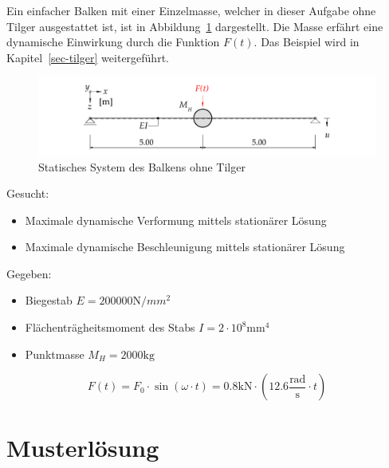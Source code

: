 \documentclass[
  letterpaper,
  DIV=11]{scrreprt}
\providecommand{\tightlist}{%
  \setlength{\itemsep}{0pt}\setlength{\parskip}{0pt}}\usepackage{longtable,booktabs,array}
\begin{document}
Ein einfacher Balken mit einer Einzelmasse, welcher in dieser Aufgabe
ohne Tilger ausgestattet ist, ist in
Abbildung~\ref{fig-ems_untilg_system_ohne_tilger} dargestellt. Die Masse
erfährt eine dynamische Einwirkung durch die Funktion \(F(t)\). Das
Beispiel wird in Kapitel~\ref{sec-tilger} weitergeführt.

\begin{figure}[H]

{\centering \includegraphics{index_files/mediabag/bilder/aufgabe_ems_untilg_system.pdf}

}

\caption{\label{fig-ems_untilg_system_ohne_tilger}Statisches System des
Balkens ohne Tilger}

\end{figure}

Gesucht:

\begin{itemize}
\tightlist
\item
  Maximale dynamische Verformung mittels stationärer Lösung
\item
  Maximale dynamische Beschleunigung mittels stationärer Lösung
\end{itemize}

Gegeben:

\begin{itemize}
\tightlist
\item
  Biegestab \(E = 200000 \text{N}/{mm}^2\)
\item
  Flächenträgheitsmoment des Stabs \(I = 2 \cdot 10^8 \text{mm}^4\)
\item
  Punktmasse \(M_H = 2000 \text{kg}\)
\end{itemize}

\[
F(t) = F_0 \cdot \sin(\omega\cdot t) = 0.8 \text{kN} \cdot (12.6 \frac{\text{rad}}{\text{s}}\cdot t)
\]

\newpage{}

\hypertarget{musterluxf6sung-7}{%
\section{Musterlösung}\label{musterluxf6sung-7}}
\end{document}
